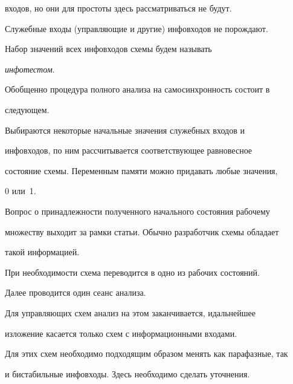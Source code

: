 входов, но они для простоты здесь рассматриваться не будут.





Служебные входы (управляющие и другие) инфовходов не порождают.





Набор значений всех инфовходов схемы будем называть 


\textit{инфотестом}.





Обобщенно процедура полного анализа на самосинхронность состоит в 


следующем.





Выбираются некоторые начальные значения служебных входов и 


инфовходов, по ним рассчитывается соответствующее равновесное 


состояние схемы. Переменным памяти можно придавать любые значения, 


0 или~1.





Вопрос о принадлежности полученного начального состояния рабочему 


множеству выходит за рамки статьи. Обычно разработчик схемы обладает 


такой информацией.





При необходимости схема переводится в одно из рабочих состояний.





Далее проводится один сеанс анализа. 





Для управляющих схем анализ на этом заканчивается, и\linebreak дальнейшее 


изложение касается только схем с информаци\-он\-ны\-ми входами.





Для этих схем необходимо подходящим образом менять как парафазные, так 


и бистабильные инфовходы. Здесь необходимо сделать уточнения.





